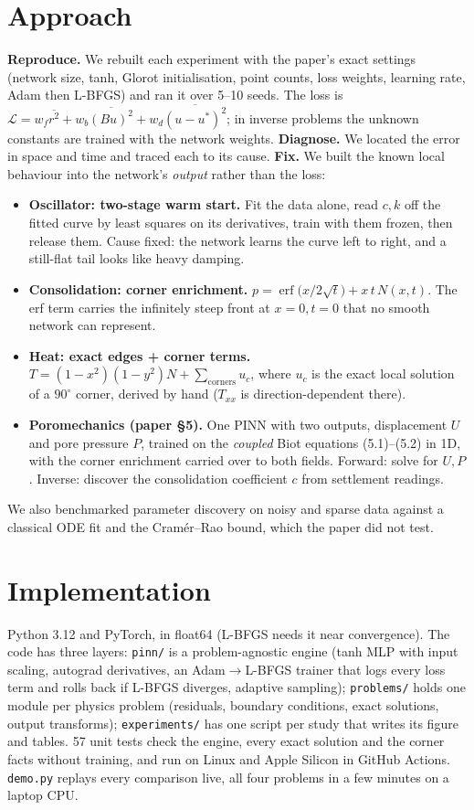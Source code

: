 \documentclass[10pt,a4paper]{article}
\begin{document}
\section{Approach}
\textbf{Reproduce.} We rebuilt each experiment with the paper's exact settings (network size, tanh,
Glorot initialisation, point counts, loss weights, learning rate, Adam then L-BFGS) and ran it over
5--10 seeds. The loss is $\mathcal{L}=w_f\overline{r^2}+w_b\overline{(B u)^2}+w_d\overline{(u-u^{*})^2}$;
in inverse problems the unknown constants are trained with the network weights.
\textbf{Diagnose.} We located the error in space and time and traced each to its cause.
\textbf{Fix.} We built the known local behaviour into the network's \emph{output} rather than the loss:
\begin{itemize}
\item \textbf{Oscillator: two-stage warm start.} Fit the data alone, read $c,k$ off the fitted curve by least
squares on its derivatives, train with them frozen, then release them. Cause fixed: the network learns the
curve left to right, and a still-flat tail looks like heavy damping.
\item \textbf{Consolidation: corner enrichment.} $p=\operatorname{erf}\!\big(x/2\sqrt{t}\big)+x\,t\,N(x,t)$. The erf term
carries the infinitely steep front at $x=0,t=0$ that no smooth network can represent.
\item \textbf{Heat: exact edges + corner terms.} $T=(1-x^2)(1-y^2)N+\sum_\text{corners}u_c$, where $u_c$ is the
exact local solution of a $90^\circ$ corner, derived by hand ($T_{xx}$ is direction-dependent there).
\item \textbf{Poromechanics (paper \S5).} One PINN with two outputs, displacement $U$ and pore pressure $P$,
trained on the \emph{coupled} Biot equations (5.1)--(5.2) in 1D, with the corner enrichment carried over to both
fields. Forward: solve for $U,P$. Inverse: discover the consolidation coefficient $c$ from settlement readings.
\end{itemize}
We also benchmarked parameter discovery on noisy and sparse data against a classical ODE fit and the
Cram\'er--Rao bound, which the paper did not test.

\section{Implementation}
Python 3.12 and PyTorch, in float64 (L-BFGS needs it near convergence). The code has three layers:
\texttt{pinn/} is a problem-agnostic engine (tanh MLP with input scaling, autograd derivatives, an
Adam$\to$L-BFGS trainer that logs every loss term and rolls back if L-BFGS diverges, adaptive sampling);
\texttt{problems/} holds one module per physics problem (residuals, boundary conditions, exact solutions,
output transforms); \texttt{experiments/} has one script per study that writes its figure and tables.
57 unit tests check the engine, every exact solution and the corner facts without training, and run on
Linux and Apple Silicon in GitHub Actions. \texttt{demo.py} replays every comparison live, all four problems in a few
minutes on a laptop CPU.
\end{document}
